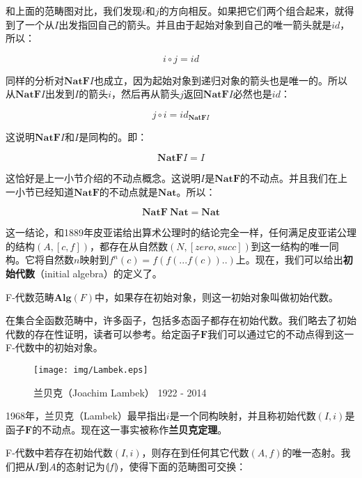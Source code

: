 \documentclass{article}
\begin{document}
和上面的范畴图对比，我们发现$i$和$j$的方向相反。如果把它们两个组合起来，就得到了一个从$I$出发指回自己的箭头。并且由于起始对象到自己的唯一箭头就是$id$，所以：

\[
i \circ j = id
\]

同样的分析对$\mathbf{NatF}I$也成立，因为起始对象到递归对象的箭头也是唯一的。所以从$\mathbf{NatF}I$出发到$I$的箭头$i$，然后再从箭头$j$返回$\mathbf{NatF}I$必然也是$id$：

\[
j \circ i = id_{\mathbf{NatF}I}
\]

这说明$\mathbf{NatF}I$和$I$是同构的。即：

\[
  \mathbf{NatF} I = I
\]

这恰好是上一小节介绍的不动点概念。这说明$I$是$\mathbf{NatF}$的不动点。并且我们在上一小节已经知道$\mathbf{NatF}$的不动点就是$\mathbf{Nat}$。所以：

\[
  \mathbf{NatF}\ \mathbf{Nat} = \mathbf{Nat}
\]

这一结论，和1889年皮亚诺给出算术公理时的结论完全一样，任何满足皮亚诺公理的结构$(A, [c, f])$，都存在从自然数$(N, [zero, succ])$到这一结构的唯一同构。它将自然数$n$映射到$f^n(c) = f(f(...f(c))..)$上。现在，我们可以给出\textbf{初始代数}（initial algebra）的定义了。

\begin{definition}
F-代数范畴$\pmb{Alg}(F)$中，如果存在初始对象，则这一初始对象叫做初始代数。
\end{definition}

在集合全函数范畴中，许多函子，包括多态函子都存在初始代数。我们略去了初始代数的存在性证明，读者可以参考\cite{Manes-Arbib-1986}。给定函子$\mathbf{F}$我们可以通过它的不动点得到这一F-代数中的初始对象。

\begin{figure}[htbp]
 \centering
 \texttt{[image: img/Lambek.eps]}
 \captionsetup{labelformat=empty}
 \caption{兰贝克（Joachim Lambek） 1922 - 2014}
 \label{fig:Lambek}
\end{figure}

1968年，兰贝克（Lambek）最早指出$i$是一个同构映射，并且称初始代数$(I, i)$是函子$\mathbf{F}$的不动点\cite{Lambek-1968}。现在这一事实被称作\textbf{兰贝克定理}。

F-代数中若存在初始代数$(I, i)$，则存在到任何其它代数$(A, f)$的唯一态射。我们把从$I$到$A$的态射记为$\llparenthesis f \rrparenthesis$，使得下面的范畴图可交换：
\end{document}
